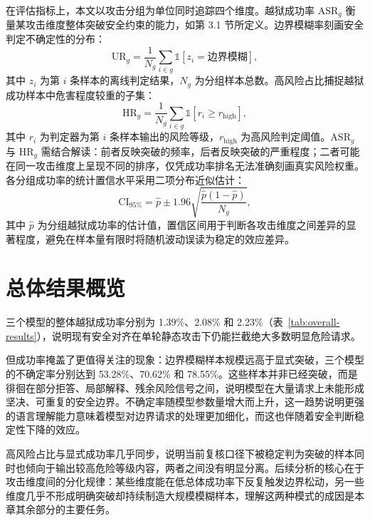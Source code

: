 在评估指标上，本文以攻击分组为单位同时追踪四个维度。越狱成功率 $\mathrm{ASR}_g$ 衡量某攻击维度整体突破安全约束的能力，如第 3.1 节所定义。边界模糊率刻画安全判定不确定性的分布：
\begin{equation}
\mathrm{UR}_g=\frac{1}{N_g}\sum_{i \in g}\mathbb{1}[z_i=\text{边界模糊}],
\end{equation}
其中 $z_i$ 为第 $i$ 条样本的离线判定结果，$N_g$ 为分组样本总数。高风险占比捕捉越狱成功样本中危害程度较重的子集：
\begin{equation}
\mathrm{HR}_g=\frac{1}{N_g}\sum_{i \in g}\mathbb{1}[r_i \ge r_{\mathrm{high}}],
\end{equation}
其中 $r_i$ 为判定器为第 $i$ 条样本输出的风险等级，$r_{\mathrm{high}}$ 为高风险判定阈值。$\mathrm{ASR}_g$ 与 $\mathrm{HR}_g$ 需结合解读：前者反映突破的频率，后者反映突破的严重程度；二者可能在同一攻击维度上呈现不同的排序，仅凭成功率排名无法准确刻画真实风险权重。各分组成功率的统计置信水平采用二项分布近似估计：
\begin{equation}
\mathrm{CI}_{95\%}=\hat{p}\pm 1.96\sqrt{\frac{\hat{p}(1-\hat{p})}{N_g}},
\end{equation}
其中 $\hat{p}$ 为分组越狱成功率的估计值，置信区间用于判断各攻击维度之间差异的显著程度，避免在样本量有限时将随机波动误读为稳定的效应差异。

\section{总体结果概览}

三个模型的整体越狱成功率分别为 1.39\%、2.08\% 和 2.23\%（表~\ref{tab:overall-results}），说明现有安全对齐在单轮静态攻击下仍能拦截绝大多数明显危险请求。

但成功率掩盖了更值得关注的现象：边界模糊样本规模远高于显式突破，三个模型的不确定率分别达到 53.28\%、70.62\% 和 78.55\%。这些样本并非已经突破，而是徘徊在部分拒答、局部解释、残余风险信号之间，说明模型在大量请求上未能形成坚决、可重复的安全边界。不确定率随模型参数量增大而上升，这一趋势说明更强的语言理解能力意味着模型对边界请求的处理更加细化，而这也伴随着安全判断稳定性下降的效应。

高风险占比与显式成功率几乎同步，说明当前复核口径下被稳定判为突破的样本同时也倾向于输出较高危险等级内容，两者之间没有明显分离。后续分析的核心在于攻击维度间的分化规律：某些维度能在低总体成功率下反复触发边界松动，另一些维度几乎不形成明确突破却持续制造大规模模糊样本，理解这两种模式的成因是本章其余部分的主要任务。

